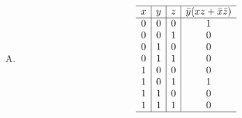 {{\begin{practices}
\begin{enumerate}[A.]
{\begin{table}[H]
                        \[
                            \begin{array}{c|c|c|c}
                                \hline
                                x & y & z & x\bar{y} + \overline{xyz} \\
                                \hline
                                0 & 0 & 0 & 1 \\
                                0 & 0 & 1 & 1 \\
                                0 & 1 & 0 & 1 \\
                                0 & 1 & 1 & 1 \\
                                1 & 0 & 0 & 1 \\
                                1 & 0 & 1 & 1 \\
                                1 & 1 & 0 & 1 \\
                                1 & 1 & 1 & 0 \\
                                \hline
                            \end{array}
                        \]
                    \end{table}
                }
                \item
                {
                    \begin{table}[H]
                        \centering

                        \[
                            \begin{array}{c|c|c|c}
                                \hline
                                x & y & z & \bar{y}(xz + \bar{x}\bar{z}) \\
                                \hline
                                0 & 0 & 0 & 1 \\
                                0 & 0 & 1 & 0 \\
                                0 & 1 & 0 & 0 \\
                                0 & 1 & 1 & 0 \\
                                1 & 0 & 0 & 0 \\
                                1 & 0 & 1 & 1 \\
                                1 & 1 & 0 & 0 \\
                                1 & 1 & 1 & 0 \\
                                \hline
                            \end{array}
                        \]
                    \end{table}
                }
            \end{enumerate}
        \end{practices}

}}
